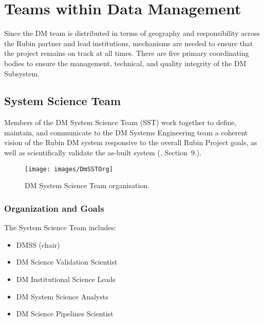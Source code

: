 \section{Teams within Data Management} \label{sect:groups}

Since the DM team is distributed in terms of geography and responsibility across the Rubin partner and lead institutions, mechanisms are needed to ensure that the project remains on track at all times. There are five primary coordinating bodies to ensure the management, technical, and quality integrity of the DM Subsystem.

\subsection{System Science Team \label{sect:dmsst}}

Members of the DM System Science Team (SST) work together to define, maintain, and communicate to the DM Systems Engineering team a coherent vision of the Rubin DM system responsive to the overall Rubin Project goals, as well as scientifically validate the as-built system (, Section~9.).

\begin{figure}[htbp]
\begin{center}
\texttt{[image: images/DmSSTOrg]}
\caption{DM System Science Team organisation.
\label{fig:sstorg}}
\end{center}
\end{figure}



\subsubsection{Organization and Goals}
\label{sect:dm-sst-org}

The System Science Team includes:
\begin{itemize}
\item \gls{DMSS} (chair)
\item DM Science Validation Scientist
\item DM Institutional Science Leads
\item DM System Science Analysts
\item DM Science Pipelines Scientist
\end{itemize}

